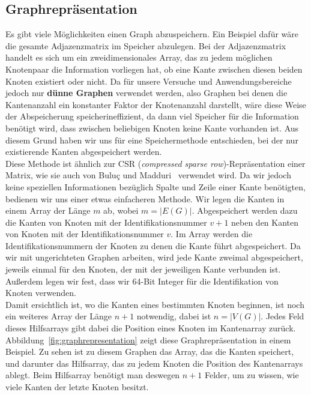 \documentclass[11pt,a4paper]{article}
\begin{document}
\subsection{Graphrepräsentation}
\label{sec:graphrepresentation}
Es gibt viele Möglichkeiten einen Graph abzuspeichern. Ein Beispiel dafür wäre die gesamte Adjazenzmatrix im Speicher abzulegen. Bei der Adjazenzmatrix handelt es sich um ein zweidimensionales Array, das zu jedem möglichen Knotenpaar die Information vorliegen hat, ob eine Kante zwischen diesen beiden Knoten existiert oder nicht. Da für unsere Versuche und Anwendungsbereiche jedoch nur \textbf{dünne Graphen} verwendet werden, also Graphen bei denen die Kantenanzahl ein konstanter Faktor der Knotenanzahl  darstellt, wäre diese Weise der Abspeicherung speicherineffizient, da dann viel Speicher für die Information benötigt wird, dass zwischen beliebigen Knoten keine Kante vorhanden ist. Aus diesem Grund haben wir uns für eine Speichermethode entschieden, bei der nur existierende Kanten abgespeichert werden.\\
Diese Methode ist ähnlich zur CSR (\textit{compressed sparse row})-Repräsentation einer Matrix, wie sie auch von Buluç und Madduri~\cite{buluc} verwendet wird. Da wir jedoch keine speziellen Informationen bezüglich Spalte und Zeile einer Kante benötigten, bedienen wir uns einer etwas einfacheren Methode. Wir legen die Kanten in einem Array der Länge \(m\) ab, wobei \(m = |E(G)|\). Abgespeichert werden dazu die Kanten von Knoten mit der Identifikationsnummer \(v+1\) neben den Kanten von Knoten mit der Identifikationsnummer \(v\). Im Array werden die Identifikationsnummern der Knoten zu denen die Kante führt abgespeichert. Da wir mit ungerichteten Graphen arbeiten, wird jede Kante zweimal abgespeichert, jeweils einmal für den Knoten, der mit der jeweiligen Kante verbunden ist. Außerdem legen wir fest, dass wir 64-Bit Integer für die Identifikation von Knoten verwenden.\\
Damit ersichtlich ist, wo die Kanten eines bestimmten Knoten beginnen, ist noch ein weiteres Array der Länge \(n+1\) notwendig, dabei ist \(n = |V(G)|\). Jedes Feld dieses Hilfsarrays gibt dabei die Position eines Knoten im Kantenarray zurück. Abbildung~\ref{fig:graphrepresentation} zeigt diese Graphrepräsentation in einem Beispiel. Zu sehen ist zu diesem Graphen das Array, das die Kanten speichert, und darunter das Hilfsarray, das zu jedem Knoten die Position des Kantenarrays ablegt. Beim Hilfsarray benötigt man deswegen \(n+1\) Felder, um zu wissen, wie viele Kanten der letzte Knoten besitzt.
\end{document}
